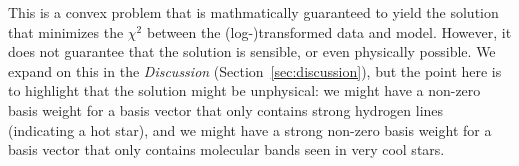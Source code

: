 \documentclass[modern]{aastex631}
\newcommand{\vectheta}{\boldsymbol{\theta}}
\newcommand{\vecalpha}{\boldsymbol{\alpha}}
\newcommand{\vecH}{\mathbf{H}} %
\begin{document}





This is a convex problem that is mathmatically guaranteed to yield the solution that minimizes the $\chi^2$ between the (log-)transformed data and model. However, it does not guarantee that the solution is sensible, or even physically possible. We expand on this in the \emph{Discussion} (Section~\ref{sec:discussion}), but the point here is to highlight that the solution might be unphysical: we might have a non-zero basis weight for a basis vector that only contains strong hydrogen lines (indicating a hot star), and we might have a strong non-zero basis weight for a basis vector that only contains molecular bands seen in very cool stars.
\end{document}
